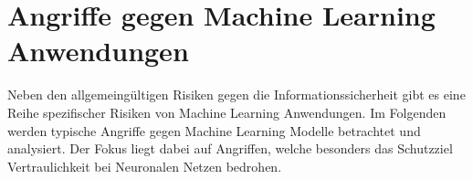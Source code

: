 \chapter{Angriffe gegen Machine Learning Anwendungen}\label{sec:angriffe}

Neben den allgemeingültigen Risiken gegen die Informationssicherheit gibt es eine Reihe spezifischer Risiken von Machine Learning Anwendungen.
Im Folgenden werden typische Angriffe gegen Machine Learning Modelle betrachtet und analysiert. 
Der Fokus liegt dabei auf Angriffen, welche besonders das Schutzziel Vertraulichkeit bei Neuronalen Netzen bedrohen.








%

